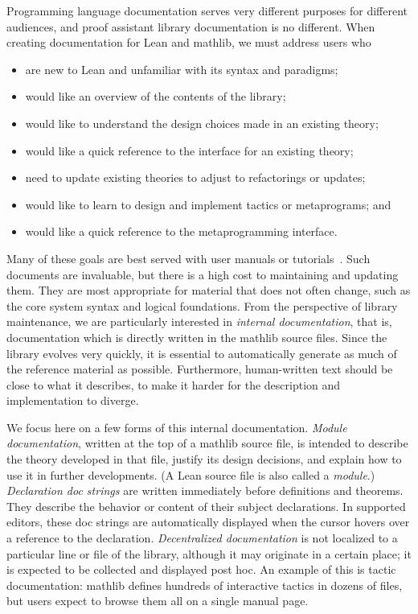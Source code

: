 \documentclass[runningheads]{llncs}
\newcommand{\mathlib}{\textsf{mathlib}\xspace}
\begin{document}
Programming language documentation serves very different purposes for different audiences,
and proof assistant library documentation is no different.
When creating documentation for Lean and \mathlib, we must address users who
\begin{itemize}
 \item are new to Lean and unfamiliar with its syntax and paradigms;
 \item would like an overview of the contents of the library;
 \item would like to understand the design choices made in an existing theory;
 \item would like a quick reference to the interface for an existing theory;
 \item need to update existing theories to adjust to refactorings or updates;
 \item would like to learn to design and implement tactics or metaprograms; and
 \item would like a quick reference to the metaprogramming interface.
\end{itemize}
Many of these goals are best served with user manuals or tutorials~\cite{Avig14}.
Such documents are invaluable,
but there is a high cost to maintaining and updating them.
They are most appropriate for material that does not often change,
such as the core system syntax and logical foundations.
From the perspective of library maintenance,
we are particularly interested in \emph{internal documentation},
that is, documentation which is directly written in the \mathlib source files.
Since the library evolves very quickly,
it is essential
to automatically generate as much of the reference material as possible.
Furthermore, human-written text should be close to what it describes,
to make it harder for the description and implementation to diverge.

We focus here on a few forms of this internal documentation.
\emph{Module documentation}, written at the top of a \mathlib source file, is intended to
describe the theory developed in that file,
justify its design decisions,
and explain how to use it in further developments.
(A Lean source file is also called a \emph{module}.)
\emph{Declaration doc strings} are written immediately before definitions and theorems.
They describe the behavior or content of their subject declarations.
In supported editors, these doc strings are
automatically displayed when the cursor hovers over a reference to the declaration.
\emph{Decentralized documentation}
is not localized to a particular line or file of the library,
although it may originate in a certain place;
it is expected to be collected and displayed post hoc.
An example of this is tactic documentation:
\mathlib defines hundreds of interactive tactics in dozens of files,
but users expect to browse them all on a single manual page.
\end{document}
